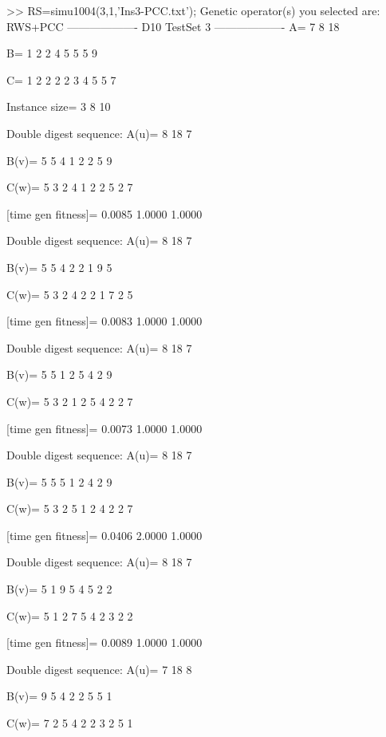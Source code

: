 >> RS=simu1004(3,1,'Ins3-PCC.txt');
Genetic operator(s) you selected are:
RWS+PCC
------------------- D10 TestSet 3 -------------------
A=
     7     8    18

B=
     1     2     2     4     5     5     5     9

C=
     1     2     2     2     2     3     4     5     5     7

Instance size=
     3     8    10

Double digest sequence:
A(u)=
     8    18     7

B(v)=
     5     5     4     1     2     2     5     9

C(w)=
     5     3     2     4     1     2     2     5     2     7

[time gen fitness]=
    0.0085    1.0000    1.0000

Double digest sequence:
A(u)=
     8    18     7

B(v)=
     5     5     4     2     2     1     9     5

C(w)=
     5     3     2     4     2     2     1     7     2     5

[time gen fitness]=
    0.0083    1.0000    1.0000

Double digest sequence:
A(u)=
     8    18     7

B(v)=
     5     5     1     2     5     4     2     9

C(w)=
     5     3     2     1     2     5     4     2     2     7

[time gen fitness]=
    0.0073    1.0000    1.0000

Double digest sequence:
A(u)=
     8    18     7

B(v)=
     5     5     5     1     2     4     2     9

C(w)=
     5     3     2     5     1     2     4     2     2     7

[time gen fitness]=
    0.0406    2.0000    1.0000

Double digest sequence:
A(u)=
     8    18     7

B(v)=
     5     1     9     5     4     5     2     2

C(w)=
     5     1     2     7     5     4     2     3     2     2

[time gen fitness]=
    0.0089    1.0000    1.0000

Double digest sequence:
A(u)=
     7    18     8

B(v)=
     9     5     4     2     2     5     5     1

C(w)=
     7     2     5     4     2     2     3     2     5     1

